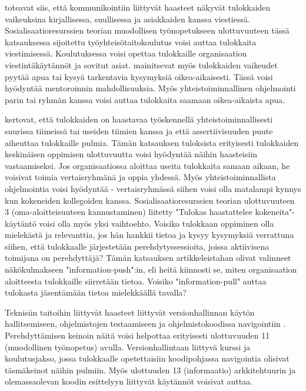 \documentclass[utf8]{gradu3}
\begin{document}
\textcite{begel-simon-2008} toteavat siis, että kommunikointiin liittyvät haasteet näkyvät tulokkaiden vaikeuksina kirjallisessa, suullisessa ja asiakkaiden kanssa viestiessä. Sosialisaatioresurssien teorian muodollisen työnopetukseen ulottuvuuteen tässä katsauksessa sijoitettu työyhteisötaitokoulutus voisi auttaa tulokkaita viestimisessä. Koulutuksessa voisi opettaa tulokkaille organisaation viestintäkäytännöt ja sovitut asiat. \textcite{begel-simon-2008} mainitsevat myös tulokkaiden vaikeudet pyytää apua tai kysyä tarkentavia kysymyksiä oikea-aikaisesti. Tässä voisi hyödyntää mentoroinnin mahdollisuuksia. Myös yhteistoiminnallinen ohjelmointi parin tai ryhmän kanssa voisi auttaa tulokkaita saamaan oikea-aikaista apua.

\textcite{begel-simon-2008} kertovat, että tulokkaiden on haastavaa työskennellä yhteistoiminnallisesti suurissa tiimeissä tai useiden tiimien kanssa ja että assertiivisuuden puute 
aiheuttaa tulokkaille pulmia. Tämän katsauksen tuloksista erityisesti tulokkaiden keskinäisen oppimisen ulottuvuutta voisi hyödyntää näihin haasteisiin vastaamiseksi. Jos organisaatiossa aloittaa useita tulokkaita samaan aikaan, he voisivat toimia vertaisryhmänä ja oppia yhdessä. Myös yhteistoiminnallista ohjelmointia voisi hyödyntää - vertaisryhmässä siihen voisi olla matalampi kynnys kun kokeneiden kollegoiden kanssa. Sosialisaatioresurssien teorian ulottuvuuteen 3 (oma-aloitteisuuteen kannustaminen) liitetty "Tulokas haastattelee kokeneita"-käytäntö voisi olla myös yksi vaihtoehto. Voisiko tulokkaan oppiminen olla mielekästä ja relevanttia, jos hän hankkii tietoa ja kysyy kysymyksiä verrattuna siihen, että tulokkaalle järjestetään perehdytyssessioita, joissa aktiivisena toimijana on perehdyttäjä? Tämän katsauksen artikkeleistahan \textcite{yates-ym-2020} olivat valinneet näkökulmakseen "information-push":in, eli heitä kiinnosti se, miten organisaation aloitteesta tulokkaille siirretään tietoa. Voisiko "information-pull" auttaa tulokasta jäsentämään tietoa mielekkäällä tavalla?

Teknisiin taitoihin liittyvät haasteet liittyvät versionhallinnan käytön hallitsemiseen, ohjelmistojen testaamiseen ja ohjelmistokoodissa navigointiin \parencite{begel-simon-2008}. Perehdyttämisen keinoin näitä voisi helpottaa erityisesti ulottuvuuden 11 (muodollinen työnopetus) avulla. Versionhallintaan liittyvä kurssi ja koulutusjakso, jossa tulokkaalle opetettaisiin koodipohjassa navigointia olisivat täsmäkeinot näihin pulmiin. Myös ulottuuden 13 (informaatio) arkkitehtuurin ja olemassaolevan koodin esittelyyn liittyvät käytännöt voisivat auttaa. 
\end{document}
